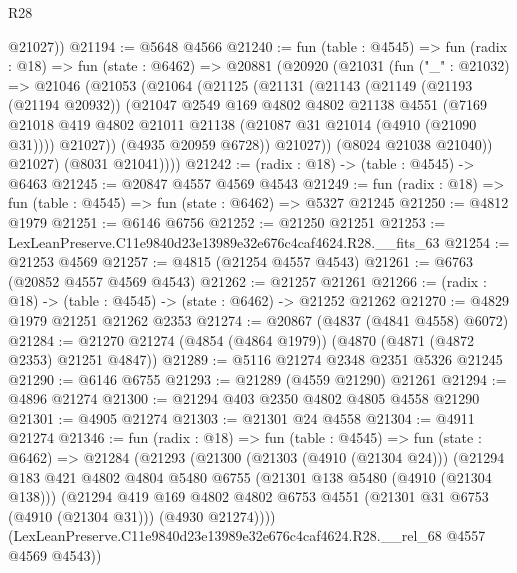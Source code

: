 \begin{lexlean}{R28}
\begin{coremodule}
        @21027))
@21194 := @5648 @4566
@21240 := fun (table : @4545) =>
  fun (radix : @18) =>
  fun (state : @6462) =>
  @20881
    (@20920
      (@21031
        (fun ("_" : @21032) =>
        @21046
          (@21053
            (@21064
              (@21125
                (@21131
                  (@21143
                    (@21149
                      (@21193 (@21194 @20932))
                      (@21047
                        @2549
                        @169
                        @4802
                        @4802
                        @21138
                        @4551
                        (@7169
                          @21018
                          @419
                          @4802
                          @21011
                          @21138
                          (@21087 @31 @21014 (@4910 (@21090 @31))))
                        @21027))
                    (@4935 @20959 @6728))
                  @21027))
              (@8024 @21038 @21040))
            @21027)
          (@8031 @21041))))
@21242 := (radix : @18) -> (table : @4545) -> @6463
@21245 := @20847 @4557 @4569 @4543
@21249 := fun (radix : @18) => fun (table : @4545) => fun (state : @6462) => @5327 @21245
@21250 := @4812 @1979
@21251 := @6146 @6756
@21252 := @21250 @21251
@21253 := LexLeanPreserve.C11e9840d23e13989e32e676c4caf4624.R28.__fits_63
@21254 := @21253 @4569
@21257 := @4815 (@21254 @4557 @4543)
@21261 := @6763 (@20852 @4557 @4569 @4543)
@21262 := @21257 @21261
@21266 := (radix : @18) -> (table : @4545) -> (state : @6462) -> @21252 @21262
@21270 := @4829 @1979 @21251 @21262 @2353
@21274 := @20867 (@4837 (@4841 @4558) @6072)
@21284 := @21270 @21274 (@4854 (@4864 @1979)) (@4870 (@4871 (@4872 @2353) @21251 @4847))
@21289 := @5116 @21274 @2348 @2351 @5326 @21245
@21290 := @6146 @6755
@21293 := @21289 (@4559 @21290) @21261
@21294 := @4896 @21274
@21300 := @21294 @403 @2350 @4802 @4805 @4558 @21290
@21301 := @4905 @21274
@21303 := @21301 @24 @4558
@21304 := @4911 @21274
@21346 := fun (radix : @18) =>
  fun (table : @4545) =>
  fun (state : @6462) =>
  @21284
    (@21293
      (@21300
        (@21303 (@4910 (@21304 @24)))
        (@21294
          @183
          @421
          @4802
          @4804
          @5480
          @6755
          (@21301 @138 @5480 (@4910 (@21304 @138)))
          (@21294
            @419
            @169
            @4802
            @4802
            @6753
            @4551
            (@21301 @31 @6753 (@4910 (@21304 @31)))
            (@4930 @21274))))
      (LexLeanPreserve.C11e9840d23e13989e32e676c4caf4624.R28.__rel_68 @4557 @4569 @4543))

\end{coremodule}
\end{lexlean}
